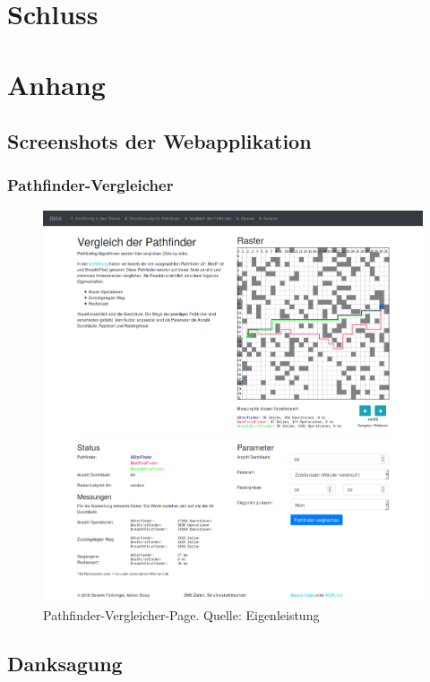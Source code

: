 \documentclass[12pt,a4paper,german]{report}
\begin{document}
\chapter{Schluss}

\chapter{Anhang}
\section{Screenshots der Webapplikation}
\subsection{Pathfinder-Vergleicher}
\begin{figure}[h]
  \centering
  \includegraphics[width=14cm]{3_full}
  \caption[Ein vollständiger Screenshot des Pathfinder-Vergleichers.]{Pathfinder-Vergleicher-Page. Quelle: Eigenleistung}
  \label{fig:comparator_screenshot}
\end{figure}

\section{Danksagung}
\blindtext
\end{document}

